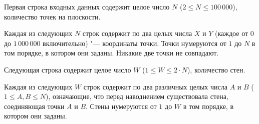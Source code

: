 Первая строка входных данных содержит целое число  $N$ ($2 \le N \le 100\,000$), количество точек на 
плоскости. 

Каждая из следующих $N$ строк содержит по два целых числа $X$ и $Y$ (каждое от $0$ до $1\,000\,000$
включительно) "--- координаты точки. Точки нумеруются от $1$ до $N$ в том порядке, в котором они заданы. 
Никакие две точки не совпадают. 

Следующая строка содержит целое число $W$ ($1 \le W \le 2 \cdot N$), количество стен. 

Каждая из следующих $W$ строк содержит по два различных целых числа $A$ и $B$ ($1 \le A, B \le N$), 
означающие, что перед наводнением существовала стена, соединяющая точки $A$ и $B$. Стены нумеруются 
от $1$ до $W$ в том порядке, в котором они заданы. 
